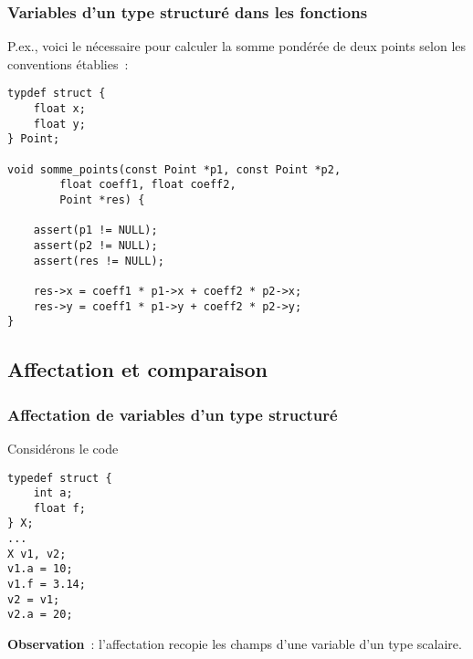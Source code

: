 \begin{frame}[fragile]
\frametitle{Variables d'un type structuré dans les fonctions}
P.ex., voici le nécessaire pour calculer la somme pondérée de deux
points selon les conventions établies~:
\begin{lstlisting}
typdef struct {
    float x;
    float y;
} Point;

void somme_points(const Point *p1, const Point *p2,
        float coeff1, float coeff2,
        Point *res) {

    assert(p1 != NULL);
    assert(p2 != NULL);
    assert(res != NULL);

    res->x = coeff1 * p1->x + coeff2 * p2->x;
    res->y = coeff1 * p1->y + coeff2 * p2->y;
}
\end{lstlisting}
\end{frame}

\subsection{Affectation et comparaison}

\begin{frame}[fragile]
\frametitle{Affectation de variables d'un type structuré}
Considérons le code
\begin{multicols}{2}
\begin{lstlisting}
typedef struct {
    int a;
    float f;
} X;
...
X v1, v2;
v1.a = 10;
v1.f = 3.14;
v2 = v1;
v2.a = 20;
\end{lstlisting}
\end{multicols}
\medskip

\begin{center}
\end{center}
\medskip

{\bf Observation}~: l'affectation recopie les champs d'une variable
d'un type scalaire.
\end{frame}


